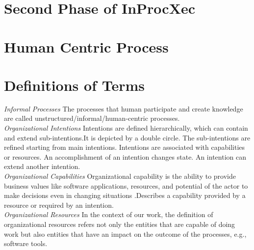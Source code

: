 \section{Second Phase of InProcXec}
\label{sec:inproxec}

\section{Human Centric Process}
\label{sec:humancentric}


\section{Definitions of Terms}
\label{sec:termdefinitions}
\textit{Informal Processes}  The processes that human participate and create knowledge are called unstructured/informal/human-centric processes.        \\

\textit{Organizational Intentions} Intentions are defined hierarchically, which can contain and extend sub-intentions.It is depicted by a double circle. The sub-intentions are refined starting from main intentions. Intentions are associated with capabilities or resources. An accomplishment of an intention changes state. An intention can extend another intention.        \\


\textit{Organizational Capabilities} Organizational capability is the ability to provide business values like software applications, resources, and potential of the actor to make decisions even in changing situations \cite{Stirna2012}.Describes a capability provided by a resource or required by an intention.    \\



\textit{Organizational Resources} In the context of our work, the definition of organizational resources refers not only the entities that are capable of doing work but also entities that have an impact on the outcome of the processes, e.g., software tools.      \\



